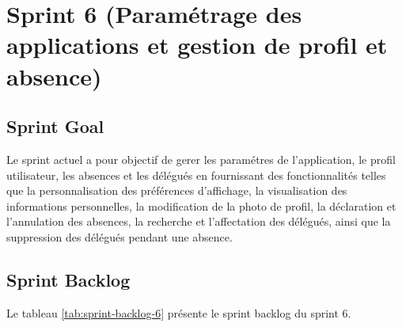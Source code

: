 \section{Sprint 6 (Paramétrage des applications et gestion de profil et absence)}

\subsection{Sprint Goal}
Le sprint actuel a pour objectif de gerer les paramétres de l'application, le profil utilisateur, les absences et les délégués en fournissant des fonctionnalités telles que la personnalisation des préférences d'affichage, la visualisation des informations personnelles, la modification de la photo de profil, la déclaration et l'annulation des absences, la recherche et l'affectation des délégués, ainsi que la suppression des délégués pendant une absence.

\subsection{Sprint Backlog}

Le tableau \ref{tab:sprint-backlog-6} présente le sprint backlog du sprint 6.

